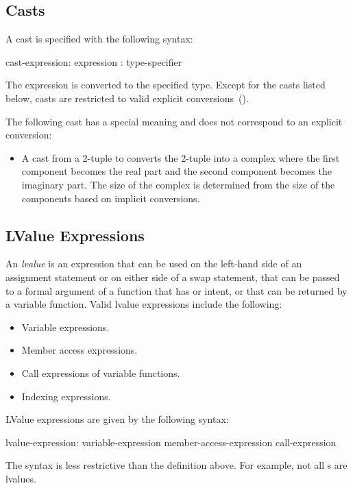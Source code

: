 \subsection{Casts}
\label{Casts}

A cast is specified with the following syntax:
\begin{syntax}
cast-expression:
  expression : type-specifier
\end{syntax}
The expression is converted to the specified type.  Except for the
casts listed below, casts are restricted to valid explicit
conversions~().

The following cast has a special meaning and does not correspond to an
explicit conversion:
\begin{itemize}
\item {}
  A cast from a 2-tuple to  converts the 2-tuple into a
  complex where the first component becomes the real part and the
  second component becomes the imaginary part.  The size of the
  complex is determined from the size of the components based on
  implicit conversions.
\end{itemize}

\subsection{LValue Expressions}
\label{lvalue}

An {\em lvalue} is an expression that can be used on the left-hand
side of an assignment statement or on either side of a swap statement,
that can be passed to a formal argument of a function that
has  or  intent, or that can be returned by a
variable function.  Valid lvalue expressions include the following:
\begin{itemize}
\item
 Variable expressions.
\item
 Member access expressions.
\item
 Call expressions of variable functions.
\item
 Indexing expressions.
\end{itemize}

LValue expressions are given by the following syntax:
\begin{syntax}
lvalue-expression:
  variable-expression
  member-access-expression
  call-expression
\end{syntax}
The syntax is less restrictive than the definition above.  For
example, not all s are lvalues.

